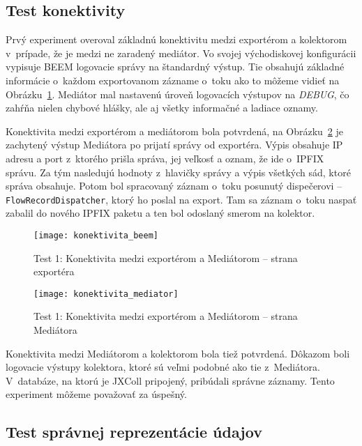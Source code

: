 
\subsection{Test konektivity}

Prvý experiment overoval základnú konektivitu medzi exportérom a kolektorom v~prípade, že je medzi ne 
zaradený mediátor. Vo svojej východiskovej konfigurácii vypisuje BEEM logovacie správy na štandardný 
výstup. Tie obsahujú základné informácie o~každom exportovanom zázname o~toku ako to môžeme vidieť na 
Obrázku~\ref{o:konektivita_beem}. Mediátor mal nastavenú úroveň logovacích výstupov na \emph{DEBUG}, 
čo zahŕňa nielen chybové hlášky, ale aj všetky informačné a ladiace oznamy. 

Konektivita medzi exportérom
a mediátorom bola potvrdená, na Obrázku~\ref{o:konektivita_mediator} je zachytený výstup Mediátora po 
prijatí správy od exportéra. Výpis obsahuje IP adresu a port z~ktorého prišla správa, jej veľkosť a 
oznam, že ide o~IPFIX správu. Za tým nasledujú hodnoty z~hlavičky správy a výpis všetkých sád, ktoré
správa obsahuje. Potom bol spracovaný záznam o~toku posunutý dispečerovi -- \verb|FlowRecordDispatcher|, 
ktorý ho poslal na export. Tam sa záznam o~toku naspať zabalil do nového IPFIX paketu a ten bol odoslaný 
smerom na kolektor.

\begin{figure}[ht!]
\centering
\texttt{[image: konektivita\_beem]}
\caption{Test 1: Konektivita medzi exportérom a Mediátorom -- strana exportéra}\label{o:konektivita_beem}
\end{figure}

\begin{figure}[ht!]
\centering
\texttt{[image: konektivita\_mediator]}
\caption{Test 1: Konektivita medzi exportérom a Mediátorom -- strana Mediátora}\label{o:konektivita_mediator}
\end{figure}

Konektivita medzi Mediátorom a kolektorom bola tiež potvrdená. Dôkazom boli logovacie výstupy kolektora, 
ktoré sú veľmi podobné ako tie z~Mediátora. V~databáze, na ktorú je JXColl pripojený, pribúdali správne 
záznamy. Tento experiment môžeme považovať za úspešný.


\subsection{Test správnej reprezentácie údajov}

